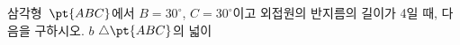 삼각형~$\pt{ABC}$에서 $B=30^\circ$, $C=30^\circ$이고 외접원의 반지름의 길이가 4일 때, 다음을 구하시오.
 $b$
 $\triangle\pt{ABC}$의 넓이
